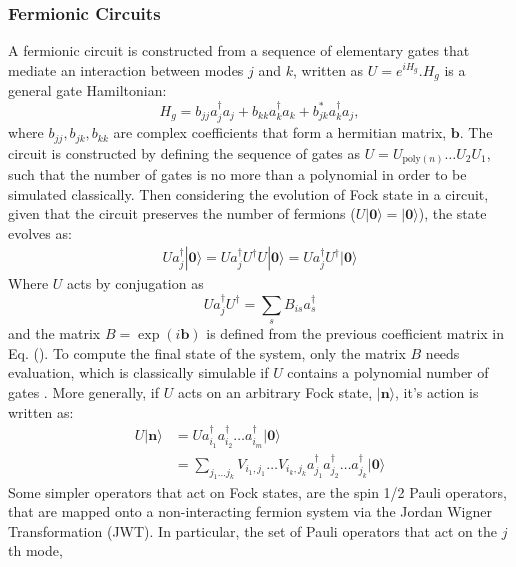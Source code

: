 \subsubsection{Fermionic Circuits}
A fermionic circuit is constructed from a sequence of elementary gates that mediate an interaction between
modes $j$ and $k$, written as $U = e^{iH_g}$.$H_g$ is a general gate Hamiltonian:
\begin{equation}\label{gateham}
    H_g = b_{jj}a_j^{\dagger}a_j + b_{kk} a_{k}^{\dagger}a_{k} + b^{*}_{jk}a_k^{\dagger}a_j,
\end{equation}
where $b_{jj}, b_{jk}, b_{kk}$ are complex coefficients that form a hermitian matrix, $\mathbf b$.
The circuit is constructed by defining the
sequence of gates as $U = U_{\text{poly}(n)} \dots U_2 U_1$, such that the number of gates is no more than a
polynomial in order to be simulated classically. Then considering the evolution of Fock state in a circuit, given that the
circuit preserves the number of fermions ($U|{\mathbf 0}\rangle = |{\mathbf 0}\rangle  $), the state evolves as:
\begin{align}
    U a_j^{\dagger} |{\mathbf 0}\rangle = U a_j^{\dagger} U^{\dagger}U |{\mathbf 0}\rangle = U a_j^{\dagger} U^{\dagger} |{\mathbf 0}\rangle
\end{align}
Where $U$ acts by conjugation as
\begin{equation}
    U a_j^{\dagger} U^{\dagger} = \sum_s B_{is} a_s^{\dagger}
\end{equation}
and the matrix $B = \exp(i{\mathbf b})$ is defined from the previous coefficient matrix in Eq. ().
To compute the final state of the system, only the matrix $B$ needs evaluation, which is classically simulable if $U$ contains
a polynomial number of gates \cite{Terhal2001}. More generally, if $U$ acts on an arbitrary Fock state, $|{\mathbf n}\rangle$, it's action
is written as:
\begin{align}
    U |{\mathbf n}\rangle & = U a_{i_1}^{\dagger} a_{i_2}^{\dagger}\dots a_{i_m}^{\dagger}|{\mathbf 0}\rangle                                                    \\
                          & = \sum_{j_1 \dots j_k} V_{i_1, j_1} \dots V_{i_k, j_k} a_{j_1}^{\dagger} a_{j_2}^{\dagger}\dots a_{j_k}^{\dagger}|{\mathbf 0}\rangle
\end{align}
Some simpler operators that act on Fock states, are the spin 1/2 Pauli operators, that are mapped onto a
non-interacting fermion system via the Jordan Wigner Transformation (JWT).
In particular, the set of Pauli operators that act on the $j$th mode,
